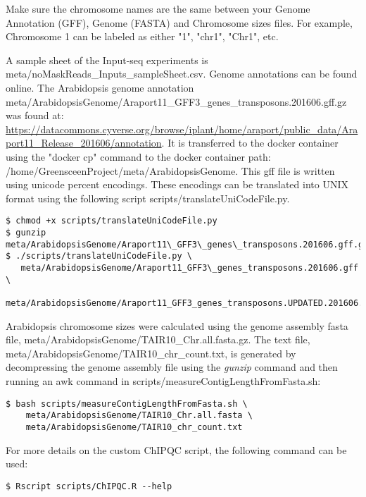 \documentclass{article}
\begin{document}
\begin{sloppypar}
Make sure the chromosome names are the same between your Genome Annotation (GFF), Genome (FASTA) and Chromosome sizes files. For example, Chromosome 1 can be labeled as either "1", "chr1", "Chr1", etc.

A sample sheet of the Input-seq experiments is {\selectfont meta/noMaskReads\_Inputs\_sampleSheet.csv}. Genome annotations can be found online. The Arabidopsis genome annotation {\selectfont meta/ArabidopsisGenome/Araport11\_GFF3\_genes\_transposons.201606.gff.gz} was found at: \url{https://datacommons.cyverse.org/browse/iplant/home/araport/public_data/Araport11_Release_201606/annotation}. It is transferred to the docker container using the "docker cp" command to the docker container path: /home/GreensceenProject/meta/ArabidopsisGenome. This gff file is written using unicode percent encodings. These encodings can be translated into UNIX format using the following script {\selectfont scripts/translateUniCodeFile.py}. 

\begin{verbatim}
$ chmod +x scripts/translateUniCodeFile.py
$ gunzip meta/ArabidopsisGenome/Araport11\_GFF3\_genes\_transposons.201606.gff.gz
$ ./scripts/translateUniCodeFile.py \
   meta/ArabidopsisGenome/Araport11_GFF3\_genes_transposons.201606.gff \
   meta/ArabidopsisGenome/Araport11_GFF3_genes_transposons.UPDATED.201606.gff   
\end{verbatim}

Arabidopsis chromosome sizes were calculated using the genome assembly fasta file,  {\selectfont meta/ArabidopsisGenome/TAIR10\_Chr.all.fasta.gz}. The text file, {\selectfont meta/ArabidopsisGenome/TAIR10\_chr\_count.txt}, is generated by decompressing the genome assembly file using the \emph{gunzip} command and then running an awk command in {\selectfont scripts/measureContigLengthFromFasta.sh}:

\begin{verbatim}
$ bash scripts/measureContigLengthFromFasta.sh \
    meta/ArabidopsisGenome/TAIR10_Chr.all.fasta \
    meta/ArabidopsisGenome/TAIR10_chr_count.txt
\end{verbatim}

For more details on the custom ChIPQC script, the following command can be used:
\begin{verbatim}
$ Rscript scripts/ChIPQC.R --help
\end{verbatim}


\end{sloppypar}
\end{document}
